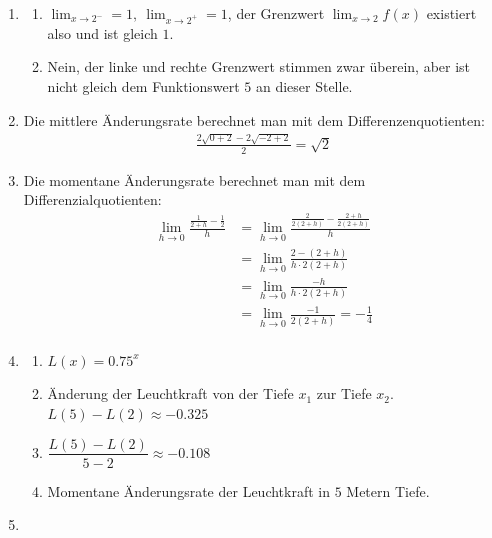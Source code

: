 \begin{enumerate}
\begin{enumerate}
          \end{enumerate}
    \item \begin{enumerate}
              \item $\displaystyle \lim_{x \to 2^-}=1,\ \lim_{x \to 2^+}=1$, der Grenzwert $\lim_{x\to 2}f(x)$ existiert also und ist gleich $1$.
              \item Nein, der linke und rechte Grenzwert stimmen zwar überein, aber ist nicht gleich dem Funktionswert $5$ an dieser Stelle.
          \end{enumerate}
    \item Die mittlere Änderungsrate berechnet man mit dem Differenzenquotienten:
          \begin{align*}
              \frac{2\sqrt{0+2}-2\sqrt{-2+2}}{2} = \sqrt{2}
          \end{align*}
    \item Die momentane Änderungsrate berechnet man mit dem Differenzialquotienten:
          \begin{align*}
              \lim_{h\to 0}\frac{\frac{1}{2+h}-\frac{1}{2}}{h} & =\lim_{h\to 0}\frac{\frac{2}{2(2+h)}-\frac{2+h}{2(2+h)}}{h} \\
                                                               & =\lim_{h\to 0}\frac{2-(2+h)}{h\cdot 2(2+h)}                 \\
                                                               & =\lim_{h\to 0}\frac{-h}{h\cdot 2(2+h)}                      \\
                                                               & =\lim_{h\to 0}\frac{-1}{2(2+h)}=   -\frac{1}{4}             \\
          \end{align*}
    \item \begin{enumerate}
              \item $L(x)=0.75^x$
              \item Änderung der Leuchtkraft von der Tiefe $x_1$ zur Tiefe $x_2$.\\
                    $L(5)-L(2)\approx -0.325$
              \item $\dfrac{L(5)-L(2)}{5-2}\approx -0.108$
              \item Momentane Änderungsrate der Leuchtkraft in $5$ Metern Tiefe.
          \end{enumerate}
    \item \begin{align*}

\end{align*}
\end{enumerate}
